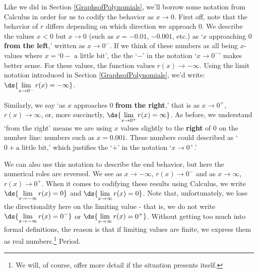 \documentclass{ximera}
\begin{document}

\begin{center}
\end{center}


\begin{center}
\end{center}



Like we did in Section \ref{GraphsofPolynomials}, we'll borrow some notation from Calculus in order for us to codify the behavior as $x \rightarrow 0$.  First off, note that the behavior of $r$ differs depending on which direction we approach $0$.  We describe the values $x<0$ but $x \rightarrow 0$  (such as $x = -0.01$, $-0.001$, etc.)  as  `$x$ approaching $0$ \textbf{from the left},' written as $x \rightarrow 0^{-}$.  If we think of these numbers as all being $x$-values where  $x  = \text{`$0-$ a little bit'}$, the  the `$-$' in the notation `$x \rightarrow 0^{-}$' makes better sense.  For these values,  the function values $r(x) \rightarrow -\infty$.   Using the limit notation introduced in Section \ref{GraphsofPolynomials}, we'd write: $\ds{ \lim_{x \rightarrow 0^{-}} r(x) = - \infty}$.  


Similarly, we say `as $x$ approaches $0$ \textbf{from the right},' that is as $x \rightarrow 0^{+}$, $r(x) \rightarrow \infty$, or, more succinctly, $\ds{ \lim_{x \rightarrow 0^{+}} r(x) =  \infty}$.  As before, we understand `from the right' means we are using $x$ values slightly to the \textbf{right} of $0$ on the number line:  numbers such as $x =0.001.$ These numbers could described as `$0 + \text{a little bit}$,' which justifies the `$+$' in the notation `$x \rightarrow 0^{+}$.'

We can also use this notation to describe the end behavior, but here the numerical roles are reversed.  We see as $x \rightarrow -\infty$, $r(x) \rightarrow 0^{-}$ and as $x \rightarrow \infty$, $r(x) \rightarrow 0^{+}$.  When it comes to codifying these results using Calculus, we write $\ds{ \lim_{x \rightarrow -\infty} r(x) =  0}$ and $\ds{ \lim_{x \rightarrow \infty} r(x) =  0}$.  Note that, unfortunately, we lose the directionality here on the limiting value - that is, we do not write $\ds{ \lim_{x \rightarrow -\infty} r(x) =  0^{-}}$ or $\ds{ \lim_{x \rightarrow \infty} r(x) =  0^{+}}$.  Without getting too much into formal definitions, the reason is that if limiting values are finite, we express them as real numbers.\footnote{We will, of course, offer more detail if the situation presents itself.}  Period.
\end{document}
